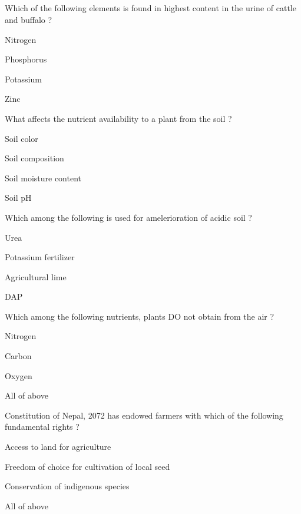 
\subsection*{}

\begin{questions}

\question Which of the following elements is found in highest content in the urine of cattle and buffalo ?
  \begin{items}
  \item* Nitrogen
  \item Phosphorus
  \item Potassium
  \item Zinc
  \end{items}

\question What affects the nutrient availability to a plant from the soil ?
  \begin{items}
  \item Soil color
  \item Soil composition
  \item Soil moisture content
  \item* Soil pH
  \end{items}

\question Which among the following is used for amelerioration of acidic soil ?
  \begin{items}
  \item Urea
  \item Potassium fertilizer
  \item* Agricultural lime
  \item DAP
  \end{items}

\question Which among the following nutrients, plants DO not obtain from the air ?
  \begin{items}
  \item* Nitrogen
  \item Carbon
  \item Oxygen
  \item All of above
  \end{items}

\question Constitution of Nepal, 2072 has endowed farmers with which of the following fundamental rights ?
  \begin{items}
  \item Access to land for agriculture
  \item Freedom of choice for cultivation of local seed
  \item Conservation of indigenous species
  \item* All of above
  \end{items}


\end{questions}
